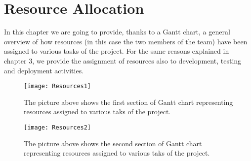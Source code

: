 \chapter{Resource Allocation}
In this chapter we are going to provide, thanks to a Gantt chart, a general overview of how resources (in this case the two members of the team) have been assigned to various tasks of the project. For the same reasons explained in chapter 3, we provide the assignment of resources also to development, testing and deployment activities.

\begin{figure}[H]
	\begin{adjustwidth}{-2in}{-2in}
		\centering
		\texttt{[image: Resources1]}
	\end{adjustwidth}
	\caption[Resource Allocation - Matteo Penco]{The picture above shows the first section of Gantt chart representing resources assigned to various taks of the project.}
	\label{fig:Resources-1}
\end{figure}

\begin{figure}[H]
	\begin{adjustwidth}{-2in}{-2in}
		\centering
		\texttt{[image: Resources2]}
	\end{adjustwidth}
	\caption[Resources Allocation - Riccardo Pressiani]{The picture above shows the second section of Gantt chart representing resources assigned to various taks of the project.}
	\label{fig:Resources-2}
\end{figure}